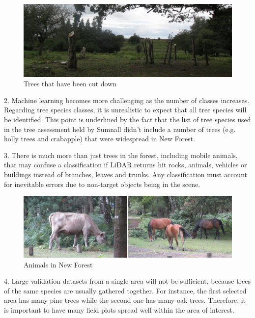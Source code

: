 \documentclass{subfiles}
\begin{document}
    \begin{figure} [!h]
    	\centering
    	\includegraphics[width=\textwidth]{img/NewForest/CC_TreesCutDown}
    	\caption{Trees that have been cut down}
    	\label{fig:CC_TreesCutDown}
    \end{figure}

    \par 2.	Machine learning becomes more challenging as the number of classes increases. Regarding tree species classes, it is unrealistic to expect that all tree species will be identified.  This point is underlined by the fact that the list of tree species used in the tree assessment held by Sumnall \cite{Sumnall2013} didn’t include a number of trees (e.g. holly trees and crabapple) that were widespread in New Forest. 
    
    \par 3.	There is much more than just trees in the forest, including mobile animals, that may confuse a classification if LiDAR returns hit rocks, animals, vehicles or buildings instead of branches, leaves and trunks.  Any classification must account for inevitable errors due to non-target objects being in the scene.
    
        \begin{figure} [!h]
        	\centering
        	\includegraphics[width=\textwidth]{img/NewForest/CC_Animals}
        	\caption{Animals in New Forest}
        	\label{fig:CC_Animals}
        \end{figure}
    
    \par 4.	Large validation datasets from a single area will not be sufficient, because trees of the same species are usually gathered together. For instance, the first selected area has many pine trees while the second one has many oak trees. Therefore, it is important to have many field plots spread well within the area of interest.  
    
\end{document}
